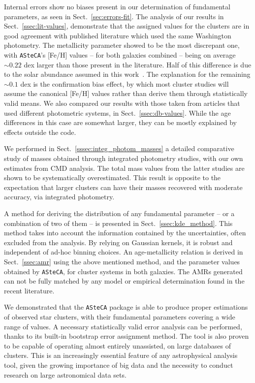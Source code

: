 \documentclass[draft]{aa}
\begin{document}
Internal errors show no biases present in our determination of fundamental
parameters, as seen in Sect.~\ref{sec:errors-fit}.
%
The analysis of our results in Sect.~\ref{ssec:lit-values}, demonstrate that the
assigned values for the clusters are in good agreement with published literature
which used the same Washington photometry.
%
The metallicity parameter showed to be the most discrepant one, with \texttt
{ASteCA}'s [Fe/H] values -- for both galaxies combined -- being on average
${\sim}0.22$ dex larger than those present in the literature. Half of this
difference is due to the solar abundance assumed in this work~\citep[$z_{\odot}
{=}0.0152$;][]{Bressan_2012}. The explanation for the remaining ${\sim}0.1$ dex
is the confirmation bias effect, by which most cluster studies will assume the
canonical [Fe/H] values rather than derive them through statistically
valid means.
%
We also compared our results with those taken from articles that used different
photometric systems, in Sect.~\ref{ssec:db-values}. While the age differences in
this case are somewhat larger, they can be mostly explained by effects outside
the code.

We performed in Sect.~\ref{sssec:integ_photom_masses} a detailed comparative
study of masses obtained through integrated photometry studies, with our own
estimates from CMD analysis.
The total mass values from the latter studies are shown to be systematically
overestimated. This result is opposite to the expectation that larger clusters
can have their masses recovered with moderate accuracy, via integrated
photometry.

A method for deriving the distribution of any fundamental parameter -- or a
combination of two of them -- is presented in Sect.~\ref{ssec:kde_method}. This
method takes into account the information contained by the uncertainties, often
excluded from the analysis. By relying on Gaussian kernels, it is robust and
independent of ad-hoc binning choices.
%
An age-metallicity relation is derived in Sect.~\ref{ssec:amr} using the above
mentioned method, and the parameter values obtained by \texttt{ASteCA}, for
cluster systems in both galaxies. The AMRs generated can not be fully matched by
any model or empirical determination found in the recent literature.

We demonstrated that the \texttt{ASteCA} package is able to produce proper
estimations of observed star clusters, with their fundamental parameters
covering a wide range of values. A necessary statistically valid error analysis
can be performed, thanks to its built-in bootstrap error assignment method.
%
The tool is also proven to be capable of operating almost entirely unassisted,
on large databases of clusters. This is an increasingly essential feature
of any astrophysical analysis tool, given the growing importance of big data and
the necessity to conduct research on large astronomical data sets.
\end{document}
